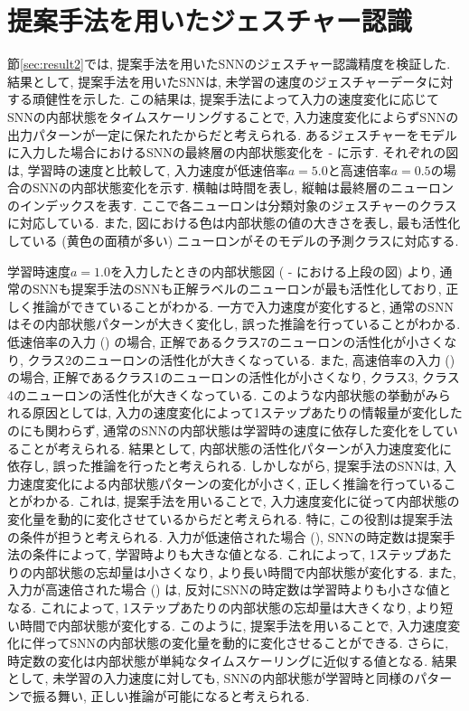 \section{提案手法を用いたジェスチャー認識}
節\ref{sec:result2}では, 提案手法を用いたSNNのジェスチャー認識精度を検証した.
結果として, 提案手法を用いたSNNは, 未学習の速度のジェスチャーデータに対する頑健性を示した.
この結果は, 提案手法によって入力の速度変化に応じてSNNの内部状態をタイムスケーリングすることで, 入力速度変化によらずSNNの出力パターンが一定に保たれたからだと考えられる.
あるジェスチャーをモデルに入力した場合におけるSNNの最終層の内部状態変化を - に示す.
それぞれの図は, 学習時の速度と比較して, 入力速度が低速倍率$a=5.0$と高速倍率$a=0.5$の場合のSNNの内部状態変化を示す.
横軸は時間を表し, 縦軸は最終層のニューロンのインデックスを表す.
ここで各ニューロンは分類対象のジェスチャーのクラスに対応している.
また, 図における色は内部状態の値の大きさを表し, 最も活性化している (黄色の面積が多い) ニューロンがそのモデルの予測クラスに対応する.

学習時速度$a=1.0$を入力したときの内部状態図 ( - における上段の図) より, 通常のSNNも提案手法のSNNも正解ラベルのニューロンが最も活性化しており, 正しく推論ができていることがわかる.
一方で入力速度が変化すると, 通常のSNNはその内部状態パターンが大きく変化し, 誤った推論を行っていることがわかる.
低速倍率の入力 () の場合, 正解であるクラス7のニューロンの活性化が小さくなり, クラス2のニューロンの活性化が大きくなっている.
また, 高速倍率の入力 () の場合, 正解であるクラス1のニューロンの活性化が小さくなり, クラス3, クラス4のニューロンの活性化が大きくなっている.
このような内部状態の挙動がみられる原因としては, 入力の速度変化によって1ステップあたりの情報量が変化したのにも関わらず, 通常のSNNの内部状態は学習時の速度に依存した変化をしていることが考えられる.
結果として, 内部状態の活性化パターンが入力速度変化に依存し, 誤った推論を行ったと考えられる.
しかしながら, 提案手法のSNNは, 入力速度変化による内部状態パターンの変化が小さく, 正しく推論を行っていることがわかる.
これは, 提案手法を用いることで, 入力速度変化に従って内部状態の変化量を動的に変化させているからだと考えられる.
特に, この役割は提案手法の条件が担うと考えられる.
入力が低速倍された場合 (), SNNの時定数は提案手法の条件によって, 学習時よりも大きな値となる.
これによって, 1ステップあたりの内部状態の忘却量は小さくなり, より長い時間で内部状態が変化する.
また, 入力が高速倍された場合 () は, 反対にSNNの時定数は学習時よりも小さな値となる.
これによって, 1ステップあたりの内部状態の忘却量は大きくなり, より短い時間で内部状態が変化する.
このように, 提案手法を用いることで, 入力速度変化に伴ってSNNの内部状態の変化量を動的に変化させることができる.
さらに, 時定数の変化は内部状態が単純なタイムスケーリングに近似する値となる.
結果として, 未学習の入力速度に対しても, SNNの内部状態が学習時と同様のパターンで振る舞い, 正しい推論が可能になると考えられる.

